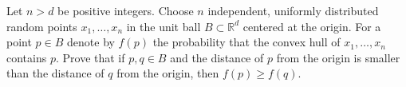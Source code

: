 Let \(n > d\) be positive integers. Choose \(n\) independent, uniformly distributed random points \(x_1, \ldots, x_n\) in the unit ball \(B \subset \mathbb{R}^d\) centered at the origin. For a point \(p \in B\) denote by \(f(p)\) the probability that the convex hull of \(x_1, \ldots, x_n\) contains \(p\). Prove that if \(p, q \in B\) and the distance of \(p\) from the origin is smaller than the distance of \(q\) from the origin, then \(f(p) \ge f(q)\).
